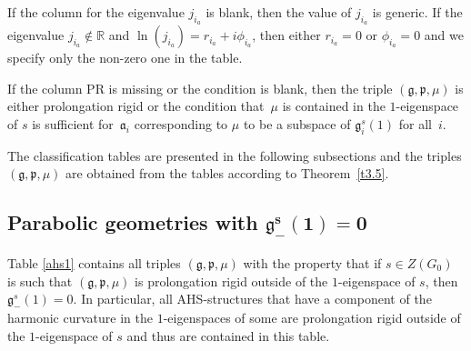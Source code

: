\documentclass[pdftex]{sigma}
\newcommand{\fg}{\mathfrak g}
\newcommand{\fp}{\mathfrak p}
\newcommand{\R}{\mathbb{R}}
\numberwithin{equation}{section}
\begin{document}
If the column for the eigenvalue $j_{i_a}$ is blank, then the value of $j_{i_a}$ is generic. If the eigenvalue $j_{i_a}\notin \R$ and $\ln(j_{i_a}) = r_{i_a} +i\phi_{i_a}$, then either $r_{i_a}=0$ or $\phi_{i_a}=0$ and we specify only the non-zero one in the table.

If the column PR is missing or the condition is blank, then the triple $(\fg,\fp,\mu)$ is either prolongation rigid or the condition that~$\mu$ is contained in the $1$-eigenspace of $s$ is suf\/f\/icient for~$\mathfrak{a}_i$ corresponding to $\mu$ to be a subspace of $\fg_i^s(1)$ for all~$i$.

The classif\/ication tables are presented in the following subsections and the triples $(\fg,\fp,\mu)$ are obtained from the tables according to Theorem~\ref{t3.5}.

\subsection[Parabolic geometries with $\fg_-^s(1)=0$]{Parabolic geometries with $\boldsymbol{\fg_-^s(1)=0}$}\label{sec5.1}

Table \ref{ahs1} contains all triples $(\fg,\fp,\mu)$ with the property that if $s\in Z(G_0)$ is such that $(\fg,\fp,\mu)$ is prolongation rigid outside of the $1$-eigenspace of $s$, then $\fg_-^s(1)=0$. In particular, all AHS-structures that have a component of the harmonic curvature in the $1$-eigenspaces of some  are prolongation rigid outside of the $1$-eigenspace of $s$ and thus are contained in this table.
\end{document}
